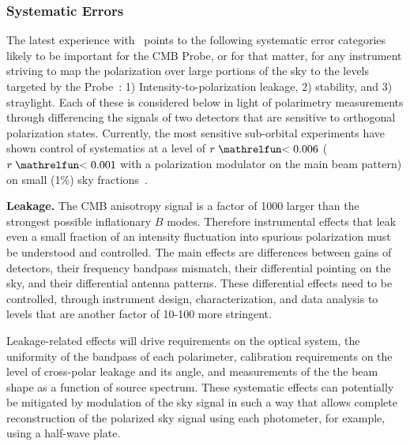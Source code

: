 
\subsubsection{Systematic Errors}
\vspace{-0.05in}

The latest experience with \planck\ points to the following systematic error categories likely to be important 
for the CMB Probe, or for that matter, for any instrument striving to map the polarization 
over large portions of the sky to the levels targeted by the Probe~\cite{planck2016_xlvi}:
1) Intensity-to-polarization leakage, 2) stability, and 3) straylight. 
Each of these is considered below in light of polarimetry measurements through
differencing the signals of two detectors that are sensitive to orthogonal polarization states. 
Currently, the most sensitive sub-orbital 
experiments have shown control of systematics at a level of $r\simlt0.006$ ($r\simlt0.001$ with 
a polarization modulator on the main beam pattern) on small (1\%) sky fractions~\cite{bicep_systematics,abs2016_hwp}.


\textbf{Leakage.}  The CMB anisotropy signal is a factor of 1000 larger 
than the strongest possible inflationary $B$ modes. Therefore instrumental effects that leak
even a small fraction of an intensity fluctuation into spurious polarization must be understood 
and controlled. The main effects are differences between gains of detectors, 
their frequency bandpass mismatch, their differential pointing on the sky, 
and their differential antenna patterns. 
These differential effects need to be controlled, through 
instrument design, characterization, and data analysis to levels that are another 
factor of 10-100 more stringent. 

Leakage-related effects will drive requirements on the optical system, the uniformity of the
bandpass of each polarimeter, calibration requirements on the level of cross-polar leakage and its angle,
and measurements of the the beam shape as a function of source spectrum. 
These systematic effects can potentially be mitigated by modulation of the sky signal in
such a way that allows complete reconstruction of the 
polarized sky signal using each photometer, for example, using a
half-wave plate.  

